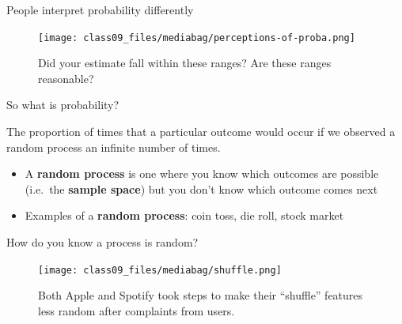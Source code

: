 \documentclass[
  ignorenonframetext,
]{beamer}
\begin{document}
\begin{frame}{People interpret probability differently}
\label{people-interpret-probability-differently}
\begin{figure}[H]

{\centering \texttt{[image: class09\_files/mediabag/perceptions-of-proba.png]}

}

\caption{Did your estimate fall within these ranges? Are these ranges
reasonable?}

\end{figure}%
\end{frame}

\begin{frame}{So what is probability?}
\label{so-what-is-probability}
\begin{tcolorbox}[enhanced jigsaw, title=\textcolor{quarto-callout-note-color}{\faInfo}\hspace{0.5em}{Frequentist Definition}, opacitybacktitle=0.6, opacityback=0, colbacktitle=quarto-callout-note-color!10!white, colframe=quarto-callout-note-color-frame, colback=white, leftrule=.75mm, breakable, toprule=.15mm, titlerule=0mm, left=2mm, coltitle=black, arc=.35mm, bottomtitle=1mm, toptitle=1mm, rightrule=.15mm, bottomrule=.15mm]

The proportion of times that a particular outcome would occur if we
observed a random process an infinite number of times.

\end{tcolorbox}

\begin{itemize}
\item
  A \textbf{random process} is one where you know which outcomes are
  possible (i.e.~the \textbf{sample space}) but you don't know which
  outcome comes next
\item
  Examples of a \textbf{random process}: coin toss, die roll, stock
  market
\end{itemize}
\end{frame}

\begin{frame}{How do you know a process is random?}
\label{how-do-you-know-a-process-is-random}
\begin{figure}[H]

{\centering \texttt{[image: class09\_files/mediabag/shuffle.png]}

}

\caption{Both Apple and Spotify took steps to make their ``shuffle''
features less random after complaints from users.}

\end{figure}%
\end{frame}
\end{document}
